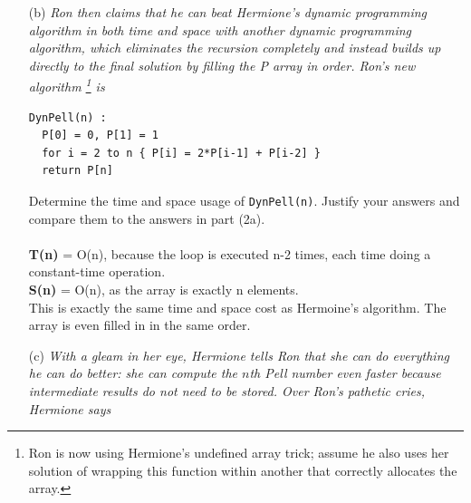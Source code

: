 \documentclass[11pt]{article} \setlength{\oddsidemargin}{0in}
\begin{document}
{\begin{enumerate}
    \begin{enumerate}
    \item[i.] \textit{Describe the behavior of \texttt{MemPell(n)} in
        terms of a traversal of a computation tree. Describe how the
        array \texttt{P} is filled.}
    \item[ii.] \textit{Determine the asymptotic running time of
        \texttt{MemPell}. Prove your claim is correct by induction on
        the contents of the array.}
    \end{enumerate}
    \begin{enumerate}
      \item[i.] If MemPell(n-1) is the left subtree, and MemPell(n-2) is the right, then the computation would look like a post-order traversal because it computes all of the (n-1) terms down to the base case, and then computes each corresponding (n-2) term before returning. The array is filled sequentially from the beginning to the end starting from the base cases. 
      \item[ii.] Because of the post-order traversal, each P[n] for n $\in$ [2..n] is calculated before anything else in the tree, which memoizes all pell numbers $\le$ n. Thus there is no computation left to do for the rest of the tree. Thus the running time must be O(n).
    \end{enumerate}
    \pagebreak
  \item[(b)] \textit{Ron then claims that he can beat Hermione's
      dynamic programming algorithm in both time and space with
      another dynamic programming algorithm, which eliminates the
      recursion completely and instead builds up directly to the final
      solution by filling the P array in order. Ron's new algorithm
      \footnote{Ron is now using Hermione's undefined array trick;
        assume he also uses her solution of wrapping this function
        within another that correctly allocates the array.} is}

\begin{verbatim}
DynPell(n) :
  P[0] = 0, P[1] = 1
  for i = 2 to n { P[i] = 2*P[i-1] + P[i-2] }
  return P[n]
\end{verbatim}

    Determine the time and space usage of \texttt{DynPell(n)}. Justify
    your answers and compare them to the answers in part (2a).
    \\\\
    \textbf{T(n)} = O(n), because the loop is executed n-2 times, each time doing a constant-time operation.\\
    \textbf{S(n)} = O(n), as the array is exactly n elements.\\
    This is exactly the same time and space cost as Hermoine's algorithm. The array is even filled in in the same order. 
    \\
  \item[(c)] \textit{With a gleam in her eye, Hermione tells Ron that
      she can do everything he can do better: she can compute the
      $n$th Pell number even faster because intermediate results do
      not need to be stored. Over Ron's pathetic cries, Hermione says}


\end{enumerate}}
\end{document}
